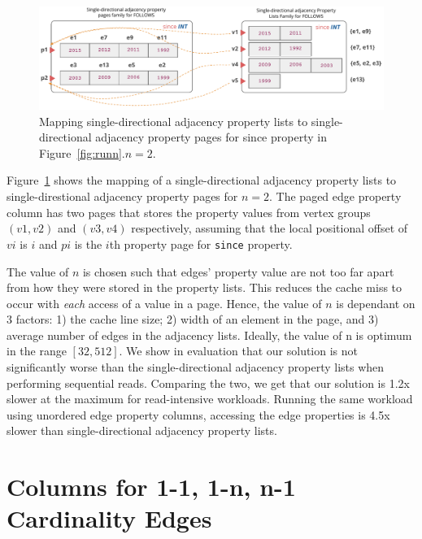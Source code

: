 \begin{figure}
	\vspace{-40pt}
	\hfill\includegraphics[scale=0.78]{img/paged}\hspace*{\fill}
	\captionsetup{justification=centering}
	\caption{Mapping single-directional adjacency property lists to single-directional adjacency property pages for since property in Figure~\ref{fig:runn}.$n=2$.}
	\label{fig:paged}
	\vspace{-5pt}
\end{figure}

Figure~\ref{fig:paged} shows the mapping of a single-directional adjacency property lists to single-direstional adjacency property pages for $n=2$. The paged edge property column has two pages that stores the property values from vertex groups $(v1,v2)$ and $(v3,v4)$ respectively, assuming that the local positional offset of $vi$ is $i$ and $pi$ is the $i$th property page for \texttt{since} property. 

The value of $n$ is chosen such that edges' property value are not too far apart from how they were stored in the property lists. This reduces the cache miss to occur with \emph{each} access of a value in a page. Hence, the value of $n$ is dependant on 3 factors: 1) the cache line size; 2) width of an element in the page, and 3) average number of edges in the adjacency lists. Ideally, the value of n is optimum in the range $[32, 512]$. We show in evaluation that our solution is not significantly worse than the single-directional adjacency property lists when performing sequential reads. Comparing the two, we get that our solution is 1.2x slower at the maximum for read-intensive workloads. Running the same workload using unordered edge property columns, accessing the edge properties is 4.5x slower than single-directional adjacency property lists.

\section{Columns for 1-1, 1-n, n-1 Cardinality Edges}
\label{sec:cols-for-single-cardinality}

